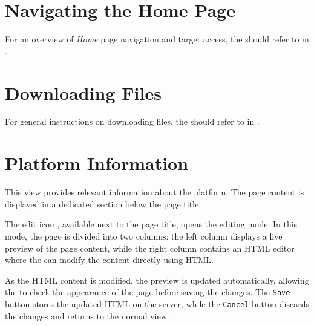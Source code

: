 \chapter{Navigating the Home Page} \label{chap:admin-homepage}

\rolecontent{\role}
{%
	
}
{} %
{%
	For an overview of \textsl{Home} page navigation and target access, the \admin should refer to  in \userpart.
}


\chapter{Downloading Files} \label{chap:admin-download-files} 

\rolecontent{\role}
{%
	
}
{} %
{%
	For general instructions on downloading files, the \admin should refer to  in \userpart.
}


\chapter{Platform Information} \label{chap:admin-platform-info} 

This view provides relevant information about the platform. The page content is displayed in a dedicated section below the page title.


The edit icon {\scriptsize \grayblue{\faEdit{}}}, available next to the page title, opens the editing mode. In this mode, the page is divided into two columns: the left column displays a live preview of the page content, while the right column contains an HTML editor where the \admin can modify the content directly using HTML.


As the HTML content is modified, the preview is updated automatically, allowing the \admin to check the appearance of the page before saving the changes. The \texttt{Save} button stores the updated HTML on the server, while the \texttt{Cancel} button discards the changes and returns to the normal view.

